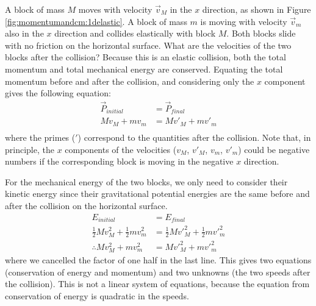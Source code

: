 \begin{example}{\label{ex:momentumandcm:1delastic}
A block of mass $M$ moves with velocity $\vec v_M$ in the $x$ direction, as shown in Figure \ref{fig:momentumandcm:1delastic}. A block of mass $m$ is moving with velocity $\vec v_m$ also in the $x$ direction and collides elastically with block $M$. Both blocks slide with no friction on the horizontal surface. What are the velocities of the two blocks after the collision?}
Because this is an elastic collision, both the total momentum and total mechanical energy are conserved. Equating the total momentum before and after the collision, and considering only the $x$ component gives the following equation:
\begin{align*}
\vec P_{initial} &=\vec P_{final}\\
Mv_M+mv_m&=Mv'_M+mv'_m\\
\end{align*}
where the primes ($'$) correspond to the quantities after the collision. Note that, in principle, the $x$ components of the velocities ($v_M$, $v'_M$, $v_m$, $v'_m$) could be negative numbers if the corresponding block is moving in the negative $x$ direction.

For the mechanical energy of the two blocks, we only need to consider their kinetic energy since their gravitational potential energies are the same before and after the collision on the horizontal surface.
\begin{align*}
E_{initial} &=E_{final}\\
\frac{1}{2}Mv_M^2+\frac{1}{2}mv_m^2&=\frac{1}{2}Mv'^2_M+\frac{1}{2}mv'^2_m\\
\therefore Mv_M^2+mv_m^2&=Mv'^2_M+mv'^2_m
\end{align*}
where we cancelled the factor of one half in the last line. This gives two equations (conservation of energy and momentum) and two unknowns (the two speeds after the collision). This is not a linear system of equations, because the equation from conservation of energy is quadratic in the speeds.


\end{example}
